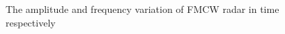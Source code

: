 \documentclass[12pt,DIV14,BCOR12mm,a4paper,footinclude=false,headinclude,parskip=half-,twoside,openright,cleardoublepage=empty,toc=index,bibliography=totoc,listof=totoc]{scrreprt}
\numberwithin{equation}{chapter}
\begin{document}
\begin{figure}
    \centering
    \hspace{-0.4cm}
    \begin{subfigure}{0.45\textwidth}
        \centering
    \end{subfigure}
    \begin{subfigure}{0.45\textwidth}
        \centering
    \end{subfigure}
    \caption{The amplitude and frequency variation of FMCW radar in time respectively}
	\label{FMCW_signal}
\end{figure}
\end{document}
